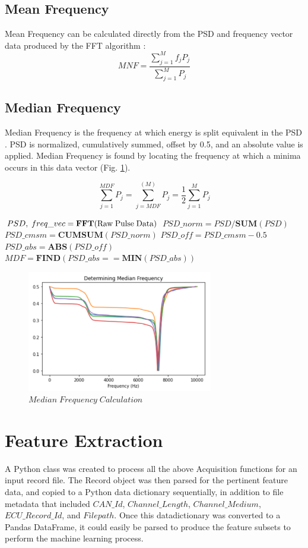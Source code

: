 \documentclass[conference]{IEEEtran}
\begin{document}
\subsection{Mean Frequency}
Mean Frequency can be calculated directly from the PSD and frequency vector data produced by the FFT algorithm \cite{angkoon2012}:
\begin{equation*}
    MNF = \frac{ \sum_{j=1}^M f_j P_j }{ \sum_{j=1}^M P_j }
\end{equation*}

\subsection{Median Frequency}
Median Frequency is the frequency at which energy is split equivalent in the PSD \cite{angkoon2012}. PSD is normalized, cumulatively summed, offset by 0.5, and an absolute value is applied.  Median Frequency is found by locating the frequency at which a minima occurs in this data vector (Fig. \ref{fig:MDF}).

\begin{equation*}
    \sum_{j=1}^{MDF} P_j = \sum_{j=MDF}^(M) P_j = \frac{1}{2} \sum_{j=1}^{M} P_j
\end{equation*}

\medbreak
\begin{algorithmic}
\STATE $PSD,\;freq\_vec = \textbf{FFT}(\text{Raw\;Pulse\;Data})$
\STATE $PSD\_norm = PSD / \textbf{SUM}(PSD)$
\STATE $PSD\_cmsm = \textbf{CUMSUM}(PSD\_norm)$
\STATE $PSD\_off = PSD\_cmsm - 0.5$
\STATE $PSD\_abs = \textbf{ABS}(PSD\_off)$
\STATE $MDF = \textbf{FIND}( PSD\_abs == \textbf{MIN}(PSD\_abs) )$
\end{algorithmic}

\begin{figure}[htb]
\centering
\includegraphics[width=3.2in]{figures/57_mdf.png}
\caption{$Median\;Frequency\;Calculation$}
\label{fig:MDF}
\end{figure}

\section{Feature Extraction}
A Python class was created to process all the above Acquisition functions for an input record file. The Record object was then parsed for the pertinent feature data, and copied to a Python data dictionary sequentially, in addition to file metadata that included $CAN\_Id$, $Channel\_Length$, $Channel\_Medium$, $ECU\_Record\_Id$, and $Filepath$.
Once this datadictionary was converted to a Pandas DataFrame, it could easily be parsed to produce the feature subsets to perform the machine learning process.
\end{document}
